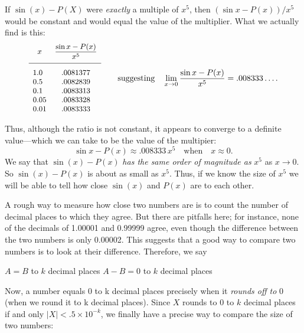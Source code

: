 {{{{ 

\newpage

        If $\sin(x) - P(X)$ were {\em exactly\/} a multiple of $x^5$, 
then $(\sin{x} - P(x))/x^5$ would be constant and would equal the value
of the multiplier.  What we actually find is this:
        \[
{\small
        \begin{array}{lc}
        \multicolumn{1}{c}{x} & 
                {\displaystyle {\sin{x} - P(x) \over x^5}} \\ [8pt]
        \hline 
        1.0\rule{0pt}{14pt}     & .0081377 \\
        0.5     & .0082839 \\
        0.1     & .0083313 \\ 
        0.05    & .0083328 \\
        0.01    & .0083333
        \end{array}
}       
        \qquad \mbox{suggesting} \quad
        \lim_{x \to 0} {\sin{x} - P(x) \over x^5} = .008333\ldots .
\]

\noindent
Thus, although the ratio is not constant,  
it appears to converge to a
definite value---which we can take to be the value of the multipier:
        \[
\sin{x} - P(x) \approx .008333 \, x^5 \quad 
                \mbox{when} \quad x \approx 0.
\]
We say that $\sin(x) - P(x)$ {\em has the same order of magnitude as\/} $x^5$ as $x \to 0$.  So $\sin(x) - P(x)$ is about as small as $x^5$.  Thus, if we know the size of $x^5$ we will be able to tell how close $\sin(x)$ and $P(x)$ are to each other.

        A rough way to measure how close two numbers are 
is to count the number of decimal places to which they agree.  But there are pitfalls here; for instance, none of the decimals of 1.00001 and 0.99999 agree, even though the difference between the two numbers is only 0.00002.  This suggests that a good way to compare two numbers is to look at their difference.  Therefore, we say
        \begin{center}
        $A = B$ to $k$ decimal places 
          \quad
        $A - B = 0$ to $k$ decimal places
        \end{center}
Now, a number equals 0 to k decimal places precisely when it {\em rounds off to\/} 0 (when we round it to k decimal places).  Since $X$ rounds to 0 to $k$ decimal places if and only $|X| < .5 \times 10^{-k}$, we finally have a precise way to compare the size of two numbers: 
\begin{center}
\end{center}

}}}}
